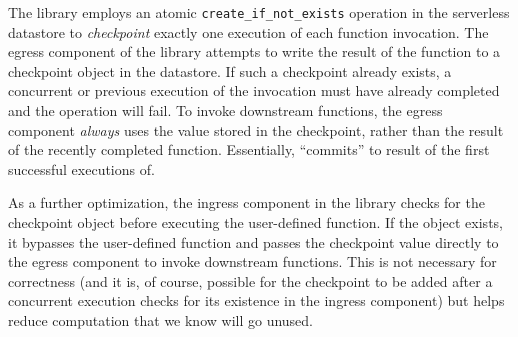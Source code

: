 The \name{} library employs an atomic \texttt{create\_if\_not\_exists}
operation in the serverless datastore to \emph{checkpoint} exactly one
execution of each function invocation. The egress component of the \name{}
library attempts to write the result of the function to a checkpoint object in
the datastore. If such a checkpoint already exists, a concurrent or previous
execution of the invocation must have already completed and the operation will
fail. To invoke downstream functions, the egress component \emph{always} uses
the value stored in the checkpoint, rather than the result of the recently
completed function. Essentially, \name{} ``commits'' to result of the first
successful executions of.


As a further optimization, the ingress component in the \name{} library checks
for the checkpoint object before executing the user-defined function. If the
object exists, it bypasses the user-defined function and passes the checkpoint
value directly to the egress component to invoke downstream functions. This is
not necessary for correctness (and it is, of course, possible for the checkpoint
to be added after a concurrent execution checks for its existence in the ingress
component) but helps reduce computation that we know will go unused.




